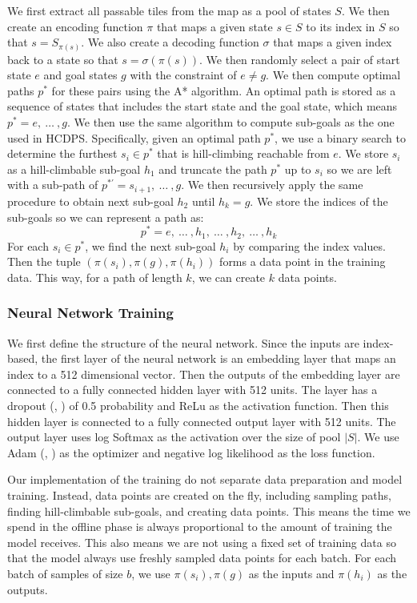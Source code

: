 \documentclass[letterpaper]{article}
\newcommand{\citea}[1]{(\citeauthor{#1}, \citeyear{#1})}
\numberwithin{equation}{section}
\numberwithin{theorem}{section}
\numberwithin{lemma}{section}
\numberwithin{df}{section}
\begin{document}
    We first extract all passable tiles from the map as a pool of states $S$.
    We then create an encoding function $\pi$ that maps a given state $s \in S $ to its index in $S$ so that $s = S_{\pi(s)}$.
    We also create a decoding function $\sigma$ that maps a given index back to a state so that $s = \sigma(\pi(s))$.
    We then randomly select a pair of start state $e$ and goal states $g$ with the constraint of $e \neq g$.
    We then compute optimal paths $p^*$ for these pairs using the A* algorithm.
    An optimal path is stored as a sequence of states that includes the start state and the goal state, which means $p^* = e, ~ \dots ~, g$.
    We then use the same algorithm to compute sub-goals as the one used in HCDPS.
    Specifically, given an optimal path $p^*$, we use a binary search to determine the furthest $s_i \in p^*$ that is hill-climbing reachable from $e$.
    We store $s_i$ as a hill-climbable sub-goal $h_1$ and truncate the path $p^*$ up to $s_i$ so we are left with a sub-path of $p^{*'} = s_{i+1}, ~ \dots ~, g$.
    We then recursively apply the same procedure to obtain next sub-goal $h_{2}$ until $h_k = g$.
    We store the indices of the sub-goals so we can represent a path as:
    \[ p^* = e, ~ \dots ~, h_1, ~ \dots ~, h_2, ~ \dots ~, h_k \]
    For each $s_i \in p^*$, we find the next sub-goal $h_i$ by comparing the index values.
    Then the tuple $\left( \pi(s_i), \pi(g), \pi(h_i) \right)$ forms a data point in the training data.
    This way, for a path of length $k$, we can create $k$ data points.

    \subsubsection{Neural Network Training}

    We first define the structure of the neural network.
    Since the inputs are index-based, the first layer of the neural network is an embedding layer that maps an index to a 512 dimensional vector.
    Then the outputs of the embedding layer are connected to a fully connected hidden layer with 512 units.
    The layer has a dropout \citea{dropout} of 0.5 probability and ReLu as the activation function.
    Then this hidden layer is connected to a fully connected output layer with 512 units.
    The output layer uses log Softmax as the activation over the size of pool $|S|$.
    We use Adam \citea{adam} as the optimizer and negative log likelihood as the loss function.

    Our implementation of the training do not separate data preparation and model training.
    Instead, data points are created on the fly, including sampling paths, finding hill-climbable sub-goals, and creating data points.
    This means the time we spend in the offline phase is always proportional to the amount of training the model receives.
    This also means we are not using a fixed set of training data so that the model always use freshly sampled data points for each batch.
    For each batch of samples of size $b$, we use $\pi(s_i), \pi(g)$ as the inputs and $\pi(h_i)$ as the outputs.
\end{document}
